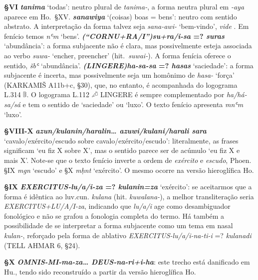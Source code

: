 \smallskip
\noindent\textbf{§VI}\tabto{2em}
\textbf{\emph{tanima}} `todas': neutro plural de \emph{tanima-}, a forma neutra
plural em \emph{-aya} aparece em Ho.\ §XV\@.
\textbf{\emph{sanawiya}} `(coisas) boas = bens': neutro com sentido abstrato. A
interpretação da forma talvez seja \emph{sana-awi-} `bem-vindo', \emph{vide}
\citet{YakubovichWelcome}. Em fenício temos \emph{nʿm} `bens'.
\textbf{\emph{\emph{(“CORNU+RA/I”)}su+ra/i-sa} {=?} \emph{suras}} `abundância':
a forma subjacente não é cla\-ra, mas possivelmente esteja associada ao verbo
\emph{suwa-} `encher, preencher' (hit.\ \emph{suwai-}). A forma fenícia oferece o
sentido, \emph{šbʿ} `abundância'.
\textbf{\emph{\emph{(LINGERE)}ha-sa-sa} {=?} \emph{hasas}} `saciedade': a forma
subjacente é incerta, mas possivel\-mente seja um homônimo de \emph{hasa-} `força'
(KARKAMIŠ A11b+c, §30), que, no entanto, é acompanhada do logograma L.314 𔕡.
O logograma L.112 𔒈 LINGERE é sempre complementado por \emph{ha/há-sa/sá} e tem
o sentido de `saciedade' ou `luxo'.
O texto fenício apresenta \emph{mnʿm} `luxo'.

\smallskip
\noindent\textbf{§VIII-X}\tabto{4em}
\textbf{\emph{azun\slash{}kulanin\slash{}haralin\ldots{} azuwi\slash{}kulani\slash{}harali sara}}
`cavalo\slash{}exér\-ci\-to\slash{}escudo sobre cavalo\slash{}exército\slash{}escudo':
literalmente, as frases significam `eu fiz X sobre X', mas o sentido parece ser
de acúmulo `eu fiz X e mais X'.
Note-se que o texto fenício inverte a ordem de \emph{exército} e \emph{escudo},
Phoen. §IX \emph{mgn} `escudo' e §X \emph{mḥnt} `exército'.
O mesmo ocorre na versão hieroglífica Ho.

\smallskip
\noindent\textbf{§IX}\tabto{2em}
\textbf{\emph{\emph{EXERCITUS}-lu/a/i-za} {=?} \emph{kulanin=za}} `exército': se
aceitarmos que a for\-ma é idêntica ao luv.cun. \emph{kulana} (hit.
\emph{kuwalana-}), a melhor transliteração seria
\emph{\emph{EXERCITUS}+LU/A/I-za}, indicando que \emph{lu/a/i} age como
desambiguador fonológico e não se grafou a fonologia completa do termo.
Há também a possibilidade de se interpretar a forma subjacente como um tema em
nasal \emph{kulan-}, reforçado pela forma de ablativo
\emph{\emph{EXERCITUS}-lu/a/i-na-ti-i} {=?} \emph{kulanadi} (TELL AHMAR 6,
§24).

\smallskip
\noindent\textbf{§X}\tabto{2em}
\textbf{\emph{\emph{OMNIS}-MI-ma-za\ldots{} \emph{DEUS}-na-ri+i-ha}}: este trecho
está danificado em Hu., tendo sido reconstruído a partir da versão hieroglífica Ho.

